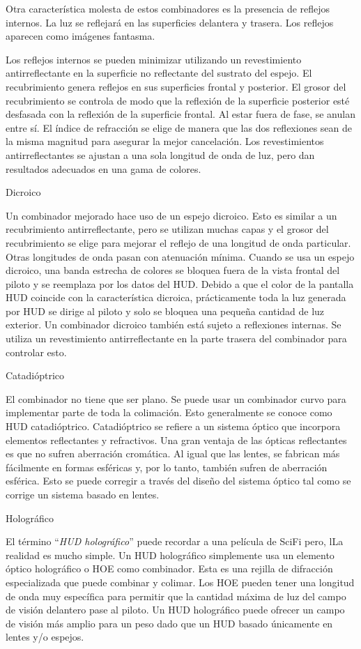 Otra característica molesta de estos combinadores es la presencia de reflejos internos. La luz se reflejará en las superficies delantera y trasera. Los reflejos aparecen como imágenes fantasma.

Los reflejos internos se pueden minimizar utilizando un revestimiento antirreflectante en la superficie no reflectante del sustrato del espejo. El recubrimiento genera reflejos en sus superficies frontal y posterior. El grosor del recubrimiento se controla de modo que la reflexión de la superficie posterior esté desfasada con la reflexión de la superficie frontal. Al estar fuera de fase, se anulan entre sí. El índice de refracción se elige de manera que las dos reflexiones sean de la misma magnitud para asegurar la mejor cancelación. Los revestimientos antirreflectantes se ajustan a una sola longitud de onda de luz, pero dan resultados adecuados en una gama de colores.

Dicroico

Un combinador mejorado hace uso de un espejo dicroico. Esto es similar a un recubrimiento antirreflectante, pero se utilizan muchas capas y el grosor del recubrimiento se elige para mejorar el reflejo de una longitud de onda particular. Otras longitudes de onda pasan con atenuación mínima. Cuando se usa un espejo dicroico, una banda estrecha de colores se bloquea fuera de la vista frontal del piloto y se reemplaza por los datos del HUD. Debido a que el color de la pantalla HUD coincide con la característica dicroica, prácticamente toda la luz generada por HUD se dirige al piloto y solo se bloquea una pequeña cantidad de luz exterior. Un combinador dicroico también está sujeto a reflexiones internas. Se utiliza un revestimiento antirreflectante en la parte trasera del combinador para controlar esto.

Catadióptrico

El combinador no tiene que ser plano. Se puede usar un combinador curvo para implementar parte de toda la colimación. Esto generalmente se conoce como HUD catadióptrico. Catadióptrico se refiere a un sistema óptico que incorpora elementos reflectantes y refractivos. Una gran ventaja de las ópticas reflectantes es que no sufren aberración cromática. Al igual que las lentes, se fabrican más fácilmente en formas esféricas y, por lo tanto, también sufren de aberración esférica. Esto se puede corregir a través del diseño del sistema óptico tal como se corrige un sistema basado en lentes.

Holográfico

El término ``{\em HUD holográfico}'' puede recordar a una película de SciFi pero, lLa realidad es mucho simple. Un HUD holográfico simplemente usa un elemento óptico holográfico o HOE como combinador. Esta es una rejilla de difracción especializada que puede combinar y colimar. Los HOE pueden tener una longitud de onda muy específica para permitir que la cantidad máxima de luz del campo de visión delantero pase al piloto. Un HUD holográfico puede ofrecer un campo de visión más amplio para un peso dado que un HUD basado únicamente en lentes y/o espejos.


